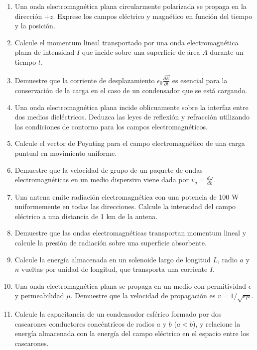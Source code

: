 \documentclass[12pt,a4paper]{book}
\begin{document}
\begin{enumerate}
\item Una onda electromagnética plana circularmente polarizada se propaga en la dirección $+z$. Exprese los campos eléctrico y magnético en función del tiempo y la posición.

\item Calcule el momentum lineal transportado por una onda electromagnética plana de intensidad $I$ que incide sobre una superficie de área $A$ durante un tiempo $t$.

\item Demuestre que la corriente de desplazamiento $\epsilon_0 \frac{\partial \vec{E}}{\partial t}$ es esencial para la conservación de la carga en el caso de un condensador que se está cargando.

\item Una onda electromagnética plana incide oblicuamente sobre la interfaz entre dos medios dieléctricos. Deduzca las leyes de reflexión y refracción utilizando las condiciones de contorno para los campos electromagnéticos.

\item Calcule el vector de Poynting para el campo electromagnético de una carga puntual en movimiento uniforme.

\item Demuestre que la velocidad de grupo de un paquete de ondas electromagnéticas en un medio dispersivo viene dada por $v_g = \frac{d\omega}{dk}$.

\item Una antena emite radiación electromagnética con una potencia de 100 W uniformemente en todas las direcciones. Calcule la intensidad del campo eléctrico a una distancia de 1 km de la antena.

\item Demuestre que las ondas electromagnéticas transportan momentum lineal y calcule la presión de radiación sobre una superficie absorbente.

\item Calcule la energía almacenada en un solenoide largo de longitud $L$, radio $a$ y $n$ vueltas por unidad de longitud, que transporta una corriente $I$.

\item Una onda electromagnética plana se propaga en un medio con permitividad $\epsilon$ y permeabilidad $\mu$. Demuestre que la velocidad de propagación es $v = 1/\sqrt{\epsilon\mu}$.

\item Calcule la capacitancia de un condensador esférico formado por dos cascarones conductores concéntricos de radios $a$ y $b$ ($a < b$), y relacione la energía almacenada con la energía del campo eléctrico en el espacio entre los cascarones.
\end{enumerate}
\end{document}
